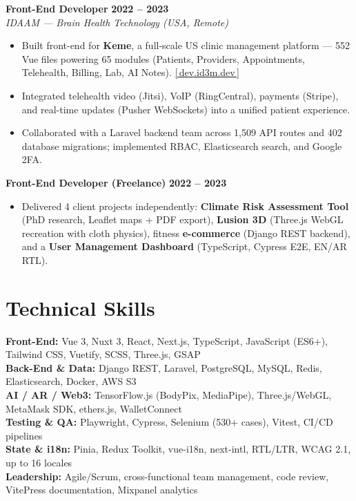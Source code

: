 \documentclass[10pt, letterpaper]{article}
\newenvironment{highlights}{
    \begin{itemize}[topsep=0.10cm, parsep=0.07cm, partopsep=0pt, itemsep=0pt, leftmargin=10pt]
}{
    \end{itemize}
}
\begin{document}
\textbf{Front-End Developer} \hfill \textbf{2022 – 2023 } \\
\textit{IDAAM — Brain Health Technology (USA, Remote)} \\
\begin{highlights}
    \item Built front-end for \textbf{Keme}, a full-scale US clinic management platform — 552 Vue files powering 65 modules (Patients, Providers, Appointments, Telehealth, Billing, Lab, AI Notes). \href{https://dev.id3m.dev}{[\,dev.id3m.dev\,]}
    \item Integrated telehealth video (Jitsi), VoIP (RingCentral), payments (Stripe), and real-time updates (Pusher WebSockets) into a unified patient experience.
    \item Collaborated with a Laravel backend team across 1,509 API routes and 402 database migrations; implemented RBAC, Elasticsearch search, and Google 2FA.
\end{highlights}

\textbf{Front-End Developer (Freelance)} \hfill \textbf{2022 – 2023} \\
\begin{highlights}
    \item Delivered 4 client projects independently: \textbf{Climate Risk Assessment Tool} (PhD research, Leaflet maps + PDF export), \textbf{Lusion 3D} (Three.js WebGL recreation with cloth physics), fitness \textbf{e-commerce} (Django REST backend), and a \textbf{User Management Dashboard} (TypeScript, Cypress E2E, EN/AR RTL).
\end{highlights}

\section{Technical Skills}

\textbf{Front-End:} Vue 3, Nuxt 3, React, Next.js, TypeScript, JavaScript (ES6+), Tailwind CSS, Vuetify, SCSS, Three.js, GSAP \\[3pt]
\textbf{Back-End \& Data:} Django REST, Laravel, PostgreSQL, MySQL, Redis, Elasticsearch, Docker, AWS S3 \\[3pt]
\textbf{AI / AR / Web3:} TensorFlow.js (BodyPix, MediaPipe), Three.js/WebGL, MetaMask SDK, ethers.js, WalletConnect \\[3pt]
\textbf{Testing \& QA:} Playwright, Cypress, Selenium (530+ cases), Vitest, CI/CD pipelines \\[3pt]
\textbf{State \& i18n:} Pinia, Redux Toolkit, vue-i18n, next-intl, RTL/LTR, WCAG 2.1, up to 16 locales \\[3pt]
\textbf{Leadership:} Agile/Scrum, cross-functional team management, code review, VitePress documentation, Mixpanel analytics
\end{document}
